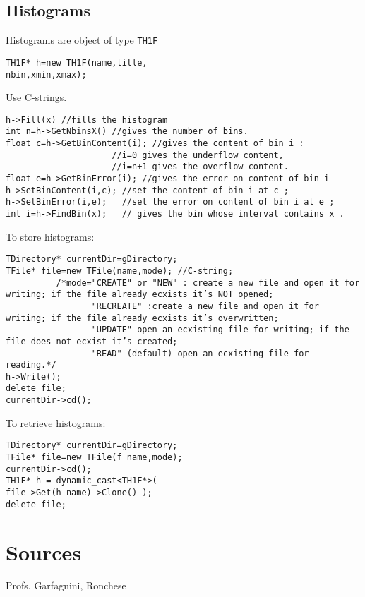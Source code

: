 \documentclass{article}
\newcommand{\code}[1]{\texttt {#1}}
\begin{document}
\subsection{Histograms}
Histograms are object of type \code{TH1F}
\begin{lstlisting}
TH1F* h=new TH1F(name,title,
nbin,xmin,xmax);
\end{lstlisting}
Use C-strings.
\begin{lstlisting}
h->Fill(x) //fills the histogram
int n=h->GetNbinsX() //gives the number of bins.
float c=h->GetBinContent(i); //gives the content of bin i :
                     //i=0 gives the underflow content,
                     //i=n+1 gives the overflow content.
float e=h->GetBinError(i); //gives the error on content of bin i 
h->SetBinContent(i,c); //set the content of bin i at c ;
h->SetBinError(i,e);   //set the error on content of bin i at e ;
int i=h->FindBin(x);   // gives the bin whose interval contains x .
\end{lstlisting}
To store histograms:
\begin{lstlisting}
TDirectory* currentDir=gDirectory;
TFile* file=new TFile(name,mode); //C-string; 
          /*mode="CREATE" or "NEW" : create a new file and open it for writing; if the file already ecxists it’s NOT opened;
                 "RECREATE" :create a new file and open it for writing; if the file already ecxists it’s overwritten;
                 "UPDATE" open an ecxisting file for writing; if the file does not ecxist it’s created;
                 "READ" (default) open an ecxisting file for reading.*/
h->Write();
delete file;
currentDir->cd();
\end{lstlisting}
To retrieve histograms:
\begin{lstlisting}
TDirectory* currentDir=gDirectory;
TFile* file=new TFile(f_name,mode);
currentDir->cd();
TH1F* h = dynamic_cast<TH1F*>(
file->Get(h_name)->Clone() );
delete file;
\end{lstlisting}























\section{Sources}
Profs. Garfagnini, Ronchese
\end{document}
